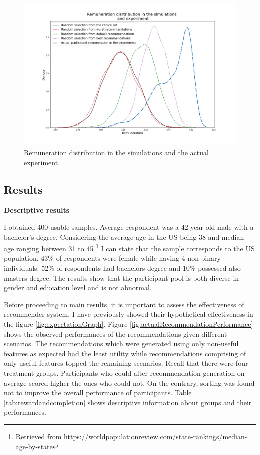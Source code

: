 \documentclass[a4paper,12pt]{article}
\begin{document}
\begin{figure}
    \centering
    \includegraphics[width=0.99\linewidth]{staticFiles/AverageRemunerationWorstToBest.png}
    \caption{Remuneration distribution in the simulations and the actual experiment}
    \label{fig:averageRemuneration}
\end{figure}




\subsection{Results}

\textbf{Descriptive results}

I obtained 400 usable samples. Average respondent was a 42 year old male with a bachelor's degree. Considering the average age in the US being 38 and median age ranging between 31 to 45 \footnote{Retrieved from https://worldpopulationreview.com/state-rankings/median-age-by-state} I can state that the sample corresponds to the US population. 43\% of respondents were female while having 4 non-binary individuals. 52\% of respondents had bachelors degree and 10\% possessed also masters degree. The results show that the participant pool is both diverse in gender and education level and is not abnormal.

Before proceeding to main results, it is important to assess the effectiveness of recommender system. I have previously showed their hypothetical effectiveness in the figure \ref{fig:expectationGraph}. Figure \ref{fig:actualRecommendationPerformance} shows the observed performances of the recommendations given different scenarios. The recommendations which were generated using only non-useful features as expected had the least utility while recommendations comprising of only useful features topped the remaining scenarios. Recall that there were four treatment groups. Participants who could alter recommendation generation on average scored higher the ones who could not. On the contrary, sorting was found not to improve the overall performance of participants. Table \ref{tab:rewardandcompletion} shows  descriptive  information about groups and their performances.
\end{document}
